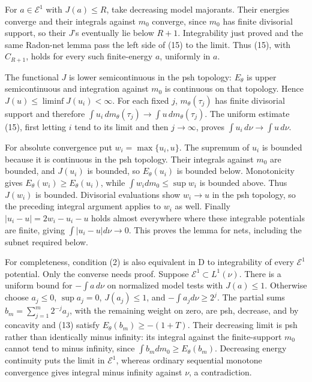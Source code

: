 \documentclass[11pt]{article}
\begin{document}
For \(a\in\mathcal E^1\) with \(J(a)\leq R\), take decreasing model majorants. Their energies converge and their integrals against \(m_0\) converge, since \(m_0\) has finite divisorial support, so their \(J\)'s eventually lie below \(R+1\). Integrability just proved and the same Radon-net lemma pass the left side of (15) to the limit. Thus (15), with \(C_{R+1}\), holds for every such finite-energy \(a\), uniformly in \(a\).

The functional \(J\) is lower semicontinuous in the psh topology: \(E_\theta\) is upper semicontinuous and integration against \(m_0\) is continuous on that topology. Hence \(J(u)\leq\liminf J(u_i)<\infty\). For each fixed \(j\), \(m_\theta(\tau_j)\) has finite divisorial support and therefore \(\int u_i\,dm_\theta(\tau_j)\to\int u\,dm_\theta(\tau_j)\). The uniform estimate (15), first letting \(i\) tend to its limit and then \(j\to\infty\), proves \(\int u_i\,d\nu\to\int u\,d\nu\).

For absolute convergence put \(w_i=\max\{u_i,u\}\). The supremum of \(u_i\) is bounded because it is continuous in the psh topology. Their integrals against \(m_0\) are bounded, and \(J(u_i)\) is bounded, so \(E_\theta(u_i)\) is bounded below. Monotonicity gives \(E_\theta(w_i)\geq E_\theta(u_i)\), while \(\int w_i dm_0\leq\sup w_i\) is bounded above. Thus \(J(w_i)\) is bounded. Divisorial evaluations show \(w_i\to u\) in the psh topology, so the preceding integral argument applies to \(w_i\) as well. Finally \(|u_i-u|=2w_i-u_i-u\) holds almost everywhere where these integrable potentials are finite, giving \(\int|u_i-u|d\nu\to0\). This proves the lemma for nets, including the subnet required below.

For completeness, condition (2) is also equivalent in D to integrability of every \(\mathcal E^1\) potential. Only the converse needs proof. Suppose \(\mathcal E^1\subset L^1(\nu)\). There is a uniform bound for \(-\int a\,d\nu\) on normalized model tests with \(J(a)\leq1\). Otherwise choose \(a_j\leq0\), \(\sup a_j=0\), \(J(a_j)\leq1\), and \(-\int a_jd\nu\geq2^j\). The partial sums \(b_m=\sum_{j=1}^m2^{-j}a_j\), with the remaining weight on zero, are psh, decrease, and by concavity and (13) satisfy \(E_\theta(b_m)\geq-(1+T)\). Their decreasing limit is psh rather than identically minus infinity: its integral against the finite-support \(m_0\) cannot tend to minus infinity, since \(\int b_mdm_0\geq E_\theta(b_m)\). Decreasing energy continuity puts the limit in \(\mathcal E^1\), whereas ordinary sequential monotone convergence gives integral minus infinity against \(\nu\), a contradiction.
\end{document}

